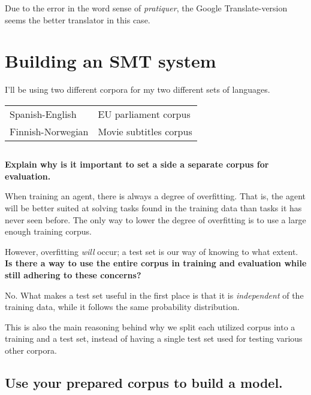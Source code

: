 \documentclass[11pt,a4paper]{article}
\begin{document}
    Due to the error in the word sense of \emph{pratiquer}, the Google Translate-version seems the better translator in this case.

  \newpage


  \section{Building an SMT system} %
  \label{sec:building_an_smt_system}

    I'll be using two different corpora for my two different sets of languages.
    \\

    \begin{tabular}{ll}
       Spanish-English   & EU parliament corpus \\
       Finnish-Norwegian & Movie subtitles corpus
    \end{tabular}

    \subsection{} %

      \textbf{Explain why is it important to set a side a separate corpus for evaluation.}

      When training an agent, there is always a degree of overfitting.
      That is, the agent will be better suited at solving tasks found in the training data than tasks it has never seen before.
      The only way to lower the degree of overfitting is to use a large enough training corpus.

      However, overfitting \emph{will} occur; a test set is our way of knowing to what extent.
      \\

      \noindent
      \textbf{Is there a way to use the entire corpus in training and evaluation while still adhering to these concerns?}

      No.
      What makes a test set useful in the first place is that it is \emph{independent} of the training data, while it follows the same probability distribution.

      This is also the main reasoning behind why we split each utilized corpus into a training and a test set, instead of having a single test set used for testing various other corpora.

    \subsection{Use your prepared corpus to build a model.} %
\end{document}
